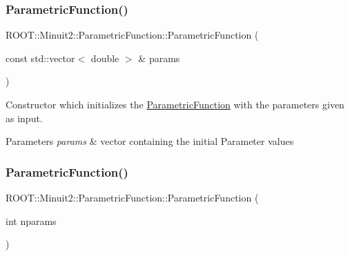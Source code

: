 \mbox{\label{classROOT_1_1Minuit2_1_1ParametricFunction_a5abce16504b1532a38da1409afdaa71d}} 
\subsubsection{\texorpdfstring{ParametricFunction()}{ParametricFunction()}\hspace{0.1cm}{\footnotesize\ttfamily [5/6]}}
{\footnotesize\ttfamily R\+O\+O\+T\+::\+Minuit2\+::\+Parametric\+Function\+::\+Parametric\+Function (\begin{DoxyParamCaption}\item[{const std\+::vector$<$ double $>$ \&}]{params }\end{DoxyParamCaption})\hspace{0.3cm}{\ttfamily [inline]}}

Constructor which initializes the \mbox{\hyperlink{classROOT_1_1Minuit2_1_1ParametricFunction}{Parametric\+Function}} with the parameters given as input.


\begin{DoxyParams}{Parameters}
{\em params} & vector containing the initial Parameter values \\
\hline
\end{DoxyParams}
\mbox{\label{classROOT_1_1Minuit2_1_1ParametricFunction_a0b8e823b3a61fc0f20ffe419e0fa1e1a}} 
\subsubsection{\texorpdfstring{ParametricFunction()}{ParametricFunction()}\hspace{0.1cm}{\footnotesize\ttfamily [6/6]}}
{\footnotesize\ttfamily R\+O\+O\+T\+::\+Minuit2\+::\+Parametric\+Function\+::\+Parametric\+Function (\begin{DoxyParamCaption}\item[{int}]{nparams }\end{DoxyParamCaption})\hspace{0.3cm}{\ttfamily [inline]}}

